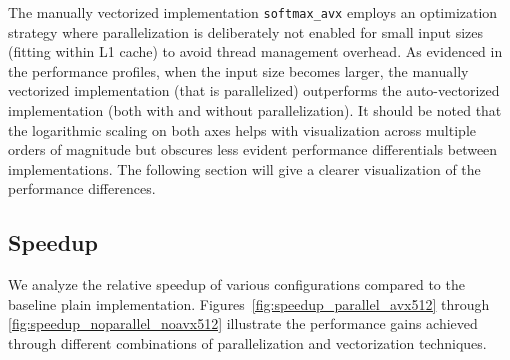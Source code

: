\documentclass[10pt]{report}
\begin{document}
The manually vectorized implementation \texttt{softmax\_avx} employs an optimization strategy where parallelization is deliberately not enabled for small input sizes (fitting within L1 cache) to avoid thread management overhead. As evidenced in the performance profiles, when the input size becomes larger, the manually vectorized implementation (that is parallelized) outperforms the auto-vectorized implementation (both with and without parallelization). It should be noted that the logarithmic scaling on both axes helps with visualization across multiple orders of magnitude but obscures less evident performance differentials between implementations. The following section will give a clearer visualization of the performance differences.

\subsection*{Speedup}
We analyze the relative speedup of various configurations compared to the baseline plain implementation. Figures~\ref{fig:speedup_parallel_avx512} through \ref{fig:speedup_noparallel_noavx512} illustrate the performance gains achieved through different combinations of parallelization and vectorization techniques.
\end{document}
